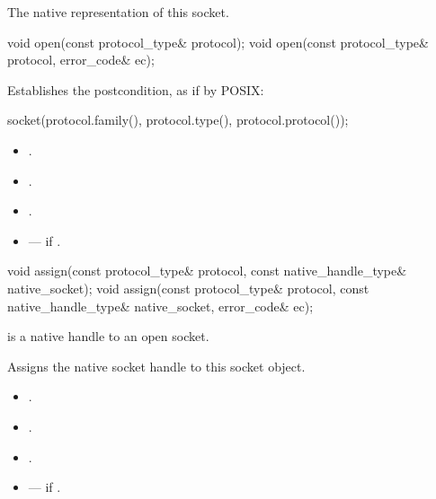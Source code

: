 \begin{itemdescr}
\pnum
\returns The native representation of this socket.
\end{itemdescr}

\begin{itemdecl}
void open(const protocol_type& protocol);
void open(const protocol_type& protocol, error_code& ec);
\end{itemdecl}

\begin{itemdescr}
\pnum
\effects Establishes the postcondition, as if by POSIX:
\begin{codeblock}
socket(protocol.family(), protocol.type(), protocol.protocol());
\end{codeblock}

\pnum
\postconditions
\begin{itemize}
\item
{}.
\item
{}.
\item
{}.
\end{itemize}

\pnum
\errors
\begin{itemize}
\item
{} --- if .
\end{itemize}
\end{itemdescr}

\begin{itemdecl}
void assign(const protocol_type& protocol,
            const native_handle_type& native_socket);
void assign(const protocol_type& protocol,
            const native_handle_type& native_socket, error_code& ec);
\end{itemdecl}

\begin{itemdescr}
\pnum
\expects {} is a native handle to an open socket.

\pnum
\effects Assigns the native socket handle to this socket object.

\pnum
\postconditions
\begin{itemize}
\item
{}.
\item
{}.
\item
{}.
\end{itemize}

\pnum
\errors
\begin{itemize}
\item
{} --- if .
\end{itemize}
\end{itemdescr}


